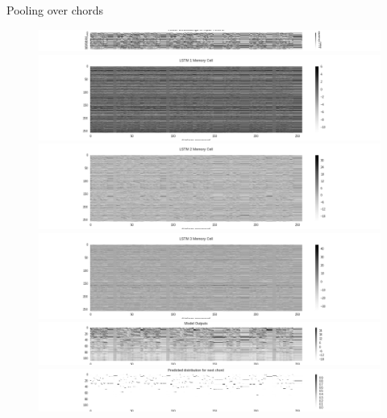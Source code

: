 \documentclass[dissertation.tex]{subfiles}
\begin{document}
Pooling over chords
\begin{figure}[htpb]
    \centering
    \includegraphics[width=1.0\linewidth]{Figures/model-analysis-chords-0.png}
    \includegraphics[width=1.0\linewidth]{Figures/model-analysis-chords-1.png}
    \includegraphics[width=1.0\linewidth]{Figures/model-analysis-chords-2.png}
    \includegraphics[width=1.0\linewidth]{Figures/model-analysis-chords-3.png}
    \includegraphics[width=1.0\linewidth]{Figures/model-analysis-chords-4.png}
    \includegraphics[width=1.0\linewidth]{Figures/model-analysis-chords-5.png}
    \caption{}
    \label{fig:}
\end{figure}
\end{document}
